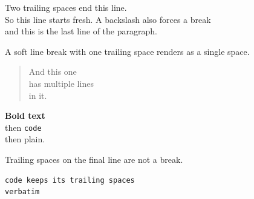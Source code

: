 Two trailing spaces end this line.\\
So this line starts fresh. A backslash also forces a break\\
and this is the last line of the paragraph.

A soft line break with one trailing space renders as a single space.

\begin{quote}
And this one\\
has multiple lines\\
in it.

\end{quote}

\textbf{Bold text}\\
then \texttt{code}\\
then plain.

Trailing spaces on the final line are not a break.

\begin{lstlisting}
code keeps its trailing spaces  
verbatim
\end{lstlisting}

